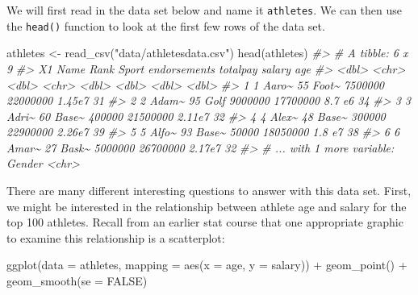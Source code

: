 \documentclass[
]{book}
\newenvironment{Shaded}{\begin{snugshade}}{\end{snugshade}}
\newcommand{\AttributeTok}[1]{\textcolor[rgb]{0.77,0.63,0.00}{#1}}
\newcommand{\CommentTok}[1]{\textcolor[rgb]{0.56,0.35,0.01}{\textit{#1}}}
\newcommand{\ConstantTok}[1]{\textcolor[rgb]{0.00,0.00,0.00}{#1}}
\newcommand{\FunctionTok}[1]{\textcolor[rgb]{0.00,0.00,0.00}{#1}}
\newcommand{\NormalTok}[1]{#1}
\newcommand{\OtherTok}[1]{\textcolor[rgb]{0.56,0.35,0.01}{#1}}
\newcommand{\SpecialCharTok}[1]{\textcolor[rgb]{0.00,0.00,0.00}{#1}}
\newcommand{\StringTok}[1]{\textcolor[rgb]{0.31,0.60,0.02}{#1}}
\begin{document}
We will first read in the data set below and name it \texttt{athletes}. We can then use the \texttt{head()} function to look at the first few rows of the data set.

\begin{Shaded}
\begin{Highlighting}[]
\NormalTok{athletes }\OtherTok{\textless{}{-}} \FunctionTok{read\_csv}\NormalTok{(}\StringTok{"data/athletesdata.csv"}\NormalTok{)}
\FunctionTok{head}\NormalTok{(athletes)}
\CommentTok{\#\textgreater{} \# A tibble: 6 x 9}
\CommentTok{\#\textgreater{}      X1 Name   Rank Sport endorsements totalpay salary   age}
\CommentTok{\#\textgreater{}   \textless{}dbl\textgreater{} \textless{}chr\textgreater{} \textless{}dbl\textgreater{} \textless{}chr\textgreater{}        \textless{}dbl\textgreater{}    \textless{}dbl\textgreater{}  \textless{}dbl\textgreater{} \textless{}dbl\textgreater{}}
\CommentTok{\#\textgreater{} 1     1 Aaro\textasciitilde{}    55 Foot\textasciitilde{}      7500000 22000000 1.45e7    31}
\CommentTok{\#\textgreater{} 2     2 Adam\textasciitilde{}    95 Golf       9000000 17700000 8.7 e6    34}
\CommentTok{\#\textgreater{} 3     3 Adri\textasciitilde{}    60 Base\textasciitilde{}       400000 21500000 2.11e7    32}
\CommentTok{\#\textgreater{} 4     4 Alex\textasciitilde{}    48 Base\textasciitilde{}       300000 22900000 2.26e7    39}
\CommentTok{\#\textgreater{} 5     5 Alfo\textasciitilde{}    93 Base\textasciitilde{}        50000 18050000 1.8 e7    38}
\CommentTok{\#\textgreater{} 6     6 Amar\textasciitilde{}    27 Bask\textasciitilde{}      5000000 26700000 2.17e7    32}
\CommentTok{\#\textgreater{} \# ... with 1 more variable: Gender \textless{}chr\textgreater{}}
\end{Highlighting}
\end{Shaded}

There are many different interesting questions to answer with this data set. First, we might be interested in the relationship between athlete age and salary for the top 100 athletes. Recall from an earlier stat course that one appropriate graphic to examine this relationship is a scatterplot:

\begin{Shaded}
\begin{Highlighting}[]
\FunctionTok{ggplot}\NormalTok{(}\AttributeTok{data =}\NormalTok{ athletes, }\AttributeTok{mapping =} \FunctionTok{aes}\NormalTok{(}\AttributeTok{x =}\NormalTok{ age, }\AttributeTok{y =}\NormalTok{ salary)) }\SpecialCharTok{+} 
  \FunctionTok{geom\_point}\NormalTok{() }\SpecialCharTok{+}
  \FunctionTok{geom\_smooth}\NormalTok{(}\AttributeTok{se =} \ConstantTok{FALSE}\NormalTok{)}
\end{Highlighting}
\end{Shaded}
\end{document}
